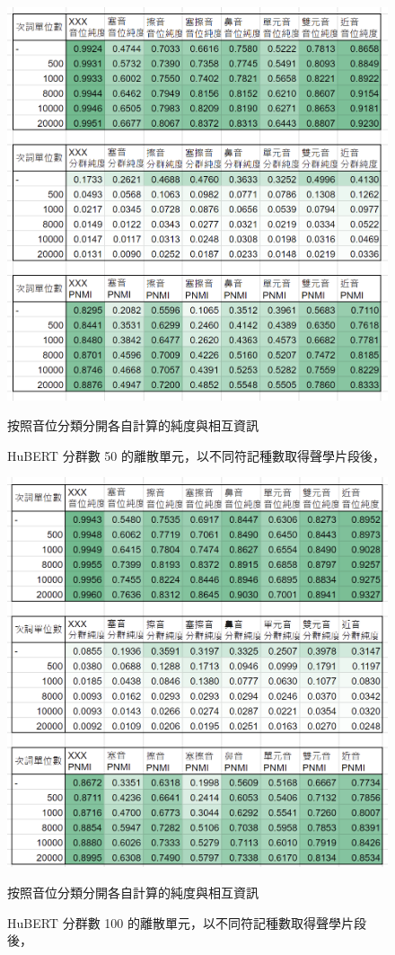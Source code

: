 

{
\begin{figure}  %
    \centering
    \includegraphics[width=0.6\linewidth]{figures/ch4figs/hub50-ap-detailedpur.png}
    \caption{HuBERT 分群數 50 的離散單元，以不同符記種數取得聲學片段後，}
    按照音位分類分開各自計算的純度與相互資訊
    \label{fig:hub50-ap-detailedpur}
\end{figure}
}


\begin{figure}
    \centering
    \includegraphics[width=0.6\linewidth]{figures/ch4figs/hub100-ap-detailedpur.png}
     \caption{HuBERT 分群數 100 的離散單元，以不同符記種數取得聲學片段後，}
    按照音位分類分開各自計算的純度與相互資訊
    \label{fig:hub100-ap-detailedpur}
\end{figure}

